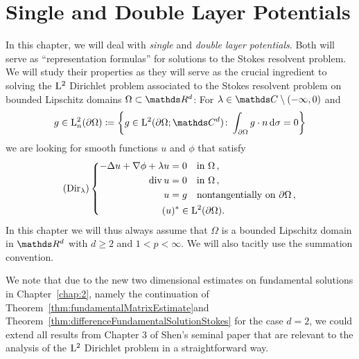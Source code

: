 \chapter{Single and Double Layer Potentials}
\label{chap:3}

In this chapter, we will deal with \emph{single} and \emph{double layer potentials}.
Both will serve as ``representation formulas'' for solutions to the Stokes resolvent problem.
We will study their properties as they will serve as the crucial ingredient to solving the $\mathrm{L}^2$ Dirichlet problem associated to the Stokes resolvent problem on bounded Lipschitz domains $\Omega \subset \R^d$:
For $\lambda \in \C \setminus (-\infty,0)$ and
\begin{align*}
  g \in \Ell^2_n(\partial\Omega) \coloneqq \bigg\{g \in \Ell^2(\partial\Omega; \C^d) \colon \int_{\partial\Omega} g \cdot n \d \sigma = 0\bigg\}
\end{align*}
we are looking for smooth functions $u$ and $\phi$ that satisfy
{
  \label{eq:dirProblem}
\begin{align*}
  (\mathrm{Dir}_\lambda)
  \left\{
  \begin{alignedat}{1}
    -\Delta u + \nabla \phi + \lambda u =&\; 0 \quad\text{in }\Omega\,, \\
    \mathrm{div\,} u =&\; 0 \quad\text{in } \Omega\,, \\ 
    u =&\; g  \quad\text{nontangentially on } \partial\Omega\,, \\
    (u)^* &\in \mathrm{L}^2(\partial\Omega).
  \end{alignedat}
    \right.
\end{align*}
}
In this chapter we will thus always assume that $\Omega$ is a bounded Lipschitz domain in $\R^d$ with $d \geq 2$ and $1 < p < \infty$.
We will also tacitly use the summation convention.

We note that due to the new two dimensional estimates on fundamental solutions in Chapter~\ref{chap:2}, namely the continuation of  Theorem~\ref{thm:fundamentalMatrixEstimate}and Theorem~\ref{thm:differenceFundamentalSolutionStokes} for the case $d=2$, we could extend all results from Chapter 3 of Shen's seminal paper \cite{Shen2012} that are relevant to the analysis of the $\mathrm{L}^2$ Dirichlet problem in a straightforward way.

